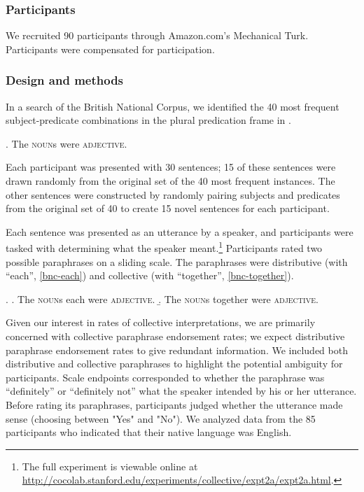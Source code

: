 \documentclass[linguex]{sp}
\newcommand{\ndg}[1]{\textcolor{Green}{[ndg: #1]}}
\newcommand{\gcs}[1]{\textcolor{blue}{[gcs: #1]}}
\begin{document}
\subsubsection{Participants}

We recruited 90 participants through Amazon.com's Mechanical Turk. Participants were compensated for participation.

\subsubsection{Design and methods}

In a search of the British National Corpus, we identified the 40 most frequent subject-predicate combinations in the plural predication frame in \Next.

\ex. The \textsc{noun}s were \textsc{adjective}.

Each participant was presented with 30 sentences; 15 of these sentences were drawn randomly 
from the original set of the 40 most frequent instances. The other sentences were constructed by randomly pairing subjects and predicates from the original set of 40 to create 15 novel sentences for each participant. 

Each sentence was presented as an utterance by a speaker, and participants were tasked with determining what the speaker meant.\footnote{The full experiment is viewable online at \url{http://cocolab.stanford.edu/experiments/collective/expt2a/expt2a.html}.} Participants rated two possible paraphrases on a sliding scale. The paraphrases were distributive (with ``each'', \ref{bnc-each}) and collective (with ``together'', \ref{bnc-together}). 

\ex. \a. The \textsc{noun}s each were \textsc{adjective}. \label{bnc-each}
\b. The \textsc{noun}s together were \textsc{adjective}. \label{bnc-together}

Given our interest in rates of collective interpretations, we are primarily concerned with collective paraphrase endorsement rates; we expect distributive paraphrase endorsement rates to give redundant information.  We included both distributive and collective paraphrases to highlight the potential ambiguity for participants.
Scale endpoints corresponded to whether the paraphrase was ``definitely'' or ``definitely not'' what the speaker intended by his or her utterance. Before rating its paraphrases, participants judged whether the utterance made sense (choosing between "Yes" and "No"). We analyzed data from the 85 participants who indicated that their native language was English.
\end{document}
